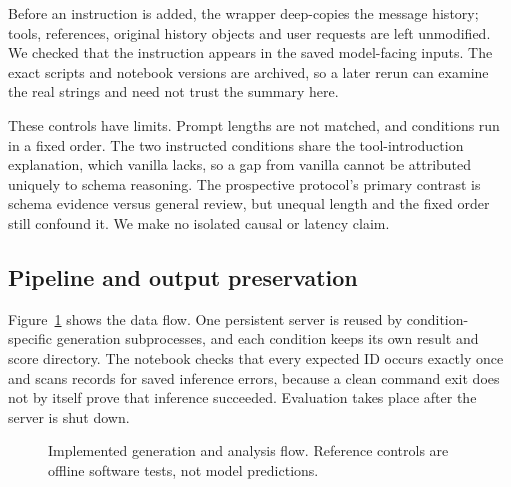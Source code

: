 \documentclass[conference]{IEEEtran}
\begin{document}
Before an instruction is added, the wrapper deep-copies the message history; tools, references, original history objects and user requests are left unmodified. We checked that the instruction appears in the saved model-facing inputs. The exact scripts and notebook versions are archived, so a later rerun can examine the real strings and need not trust the summary here.

These controls have limits. Prompt lengths are not matched, and conditions run in a fixed order. The two instructed conditions share the tool-introduction explanation, which vanilla lacks, so a gap from vanilla cannot be attributed uniquely to schema reasoning. The prospective protocol's primary contrast is schema evidence versus general review, but unequal length and the fixed order still confound it. We make no isolated causal or latency claim.

\subsection{Pipeline and output preservation}
Figure~\ref{fig:pipeline} shows the data flow. One persistent server is reused by condition-specific generation subprocesses, and each condition keeps its own result and score directory. The notebook checks that every expected ID occurs exactly once and scans records for saved inference errors, because a clean command exit does not by itself prove that inference succeeded. Evaluation takes place after the server is shut down.

\begin{figure}[t]\centering
{}
\caption{Implemented generation and analysis flow. Reference controls are offline software tests, not model predictions.}\label{fig:pipeline}
\end{figure}
\end{document}
